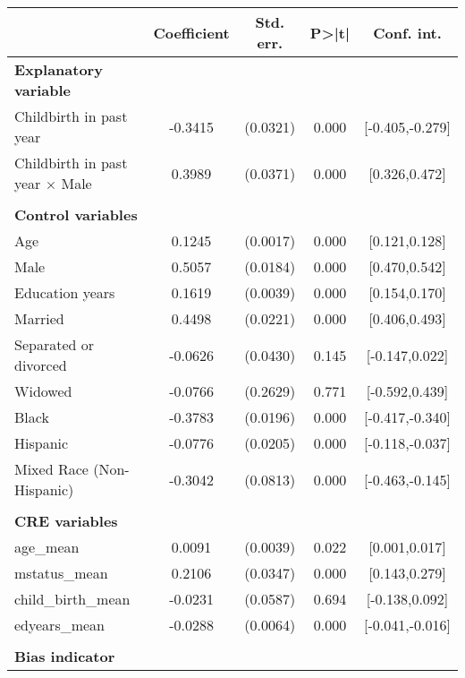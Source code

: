{
\def\sym#1{\ifmmode^{#1}\else\(^{#1}\)\fi}
\begin{tabular}{l*{1}{cccc}}
\toprule
                    & Coefficient&   Std. err.&       P>|t|&  Conf. int.\\
\midrule
\textbf{Explanatory variable}&            &            &            &            \\
Childbirth in past year&     -0.3415&    (0.0321)&       0.000&[-0.405,-0.279]\\
Childbirth in past year $\times$ Male&      0.3989&    (0.0371)&       0.000&[0.326,0.472]\\
\\ \textbf{Control variables}&            &            &            &            \\
Age                 &      0.1245&    (0.0017)&       0.000&[0.121,0.128]\\
Male                &      0.5057&    (0.0184)&       0.000&[0.470,0.542]\\
Education years     &      0.1619&    (0.0039)&       0.000&[0.154,0.170]\\
Married             &      0.4498&    (0.0221)&       0.000&[0.406,0.493]\\
Separated or divorced&     -0.0626&    (0.0430)&       0.145&[-0.147,0.022]\\
Widowed             &     -0.0766&    (0.2629)&       0.771&[-0.592,0.439]\\
Black               &     -0.3783&    (0.0196)&       0.000&[-0.417,-0.340]\\
Hispanic            &     -0.0776&    (0.0205)&       0.000&[-0.118,-0.037]\\
Mixed Race (Non-Hispanic)&     -0.3042&    (0.0813)&       0.000&[-0.463,-0.145]\\
\\ \textbf{CRE variables}&            &            &            &            \\
age\_mean            &      0.0091&    (0.0039)&       0.022&[0.001,0.017]\\
mstatus\_mean        &      0.2106&    (0.0347)&       0.000&[0.143,0.279]\\
child\_birth\_mean    &     -0.0231&    (0.0587)&       0.694&[-0.138,0.092]\\
edyears\_mean        &     -0.0288&    (0.0064)&       0.000&[-0.041,-0.016]\\
\\ \textbf{Bias indicator}&            &            &            &            \\

\end{tabular}}
